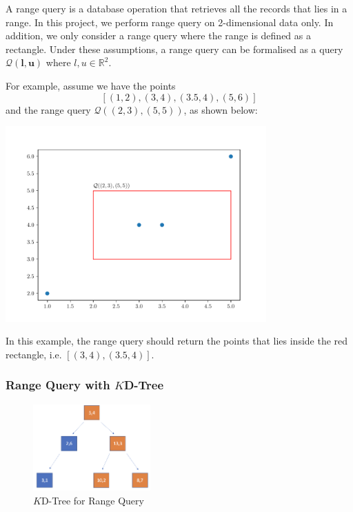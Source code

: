 A range query is a database operation that retrieves all the records that lies in a range. In this project, we perform range query on 2-dimensional data only. In addition, we only consider a range query where the range is defined as a rectangle. Under these assumptions, a range query can be formalised as a query $\mathcal{Q}(\boldsymbol{l}, \boldsymbol{u})$ where $l,u\in\mathbb{R}^2$.

\begin{mscexample}
	For example, assume we have the points
	$$
	[(1,2), (3,4), (3.5, 4), (5,6)]
	$$
	and the range query $\mathcal{Q}((2,3), (5,5))$, as shown below:
	
	\begin{minipage}[t]{\linewidth}
	\centering
   	\includegraphics[width=10cm]{graphs/implementation/queries/range_query.pdf}
   	\label{fig:range_query_demo}
	\end{minipage}
	
In this example, the range query should return the points that lies inside the red rectangle, i.e. $[(3,4), (3.5, 4)]$.

\end{mscexample}

\subsubsection{Range Query with $K$D-Tree}

\begin{figure}[htp]
    \centering
    \includegraphics[width=0.4\textwidth]{graphs/Range_Query_Tree.png}
    \caption{$K$D-Tree for Range Query}
    \label{fig:KD-Tree_for_Range Query}
\end{figure}

